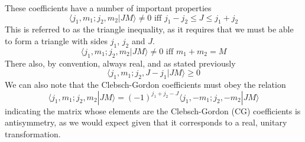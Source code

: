 \documentclass[12pt]{article}
\begin{document}
\noindent These coefficients have a number of important properties\\
\begin{equation}
\langle j_{1}, m_{1}; j_{2},m_{2} | JM\rangle \neq 0 \text{ \ \ \ \ iff \ \ \ } j_{1}-j_{2} \leq J \leq j_{1}+j_{2}
\end{equation}
This is referred to as the triangle inequality, as it requires that we must be
able to form a triangle with sides $j_{1}$, $j_{2}$  and $J$. 
\begin{equation}
\langle j_{1}, m_{1}; j_{2},m_{2} | JM\rangle \neq 0 \text{ \ \ \ \ iff \ \ \ } m_{1}+m_{2} = M
\end{equation}
There also, by convention, always real, and as stated previously
\begin{equation}
\langle j_{1}, m_{1}; j_{2},J-j_{1} | JM\rangle \geq 0
\end{equation}
We can also note that the Clebsch-Gordon coefficients must obey the relation
\begin{equation}
\langle j_{1}, m_{1}; j_{2},m_{2} | JM\rangle = 
(-1)^{j_{1}+j_{2}-J}
\langle j_{1}, -m_{1}; j_{2}, -m_{2} | JM\rangle
\end{equation}
indicating the matrix whose elements are the Clebsch-Gordon (CG)  coefficients
is antisymmetry, as we would expect given that it corresponds to a real,
unitary transformation.\\
\end{document}
